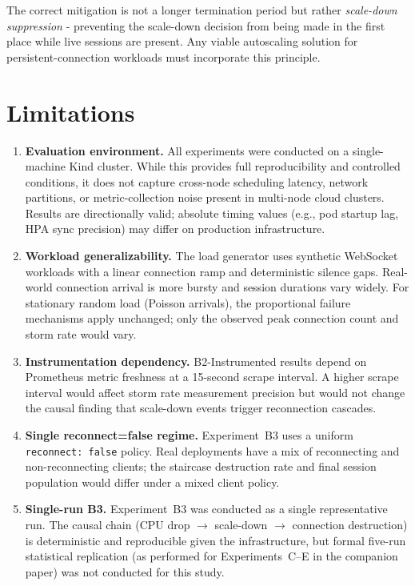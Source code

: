 \documentclass[twocolumn]{svjour3}
\begin{document}
The correct mitigation is not a longer termination period but rather \textit{scale-down
suppression} - preventing the scale-down decision from being made in the first place while
live sessions are present. Any viable autoscaling solution for persistent-connection workloads
must incorporate this principle.



\section{Limitations}
\label{sec:limitations}

\begin{enumerate}[leftmargin=*]

\item \textbf{Evaluation environment.} All experiments were conducted on a single-machine
Kind cluster. While this provides full reproducibility and controlled conditions, it does not
capture cross-node scheduling latency, network partitions, or metric-collection noise present
in multi-node cloud clusters. Results are directionally valid; absolute timing values
(e.g., pod startup lag, HPA sync precision) may differ on production infrastructure.

\item \textbf{Workload generalizability.} The load generator uses synthetic WebSocket
workloads with a linear connection ramp and deterministic silence gaps. Real-world connection
arrival is more bursty and session durations vary widely. For stationary random load (Poisson
arrivals), the proportional failure mechanisms apply unchanged; only the observed peak
connection count and storm rate would vary.

\item \textbf{Instrumentation dependency.} B2-Instrumented results depend on Prometheus
metric freshness at a 15-second scrape interval. A higher scrape interval would affect storm
rate measurement precision but would not change the causal finding that scale-down events
trigger reconnection cascades.

\item \textbf{Single reconnect=false regime.} Experiment~B3 uses a uniform
\texttt{reconnect: false} policy. Real deployments have a mix of reconnecting and
non-reconnecting clients; the staircase destruction rate and final session population would
differ under a mixed client policy.

\item \textbf{Single-run B3.} Experiment~B3 was conducted as a single representative run.
The causal chain (CPU drop $\rightarrow$ scale-down $\rightarrow$ connection destruction) is
deterministic and reproducible given the infrastructure, but formal five-run statistical
replication (as performed for Experiments~C--E in the companion paper) was not conducted
for this study.

\end{enumerate}
\end{document}
